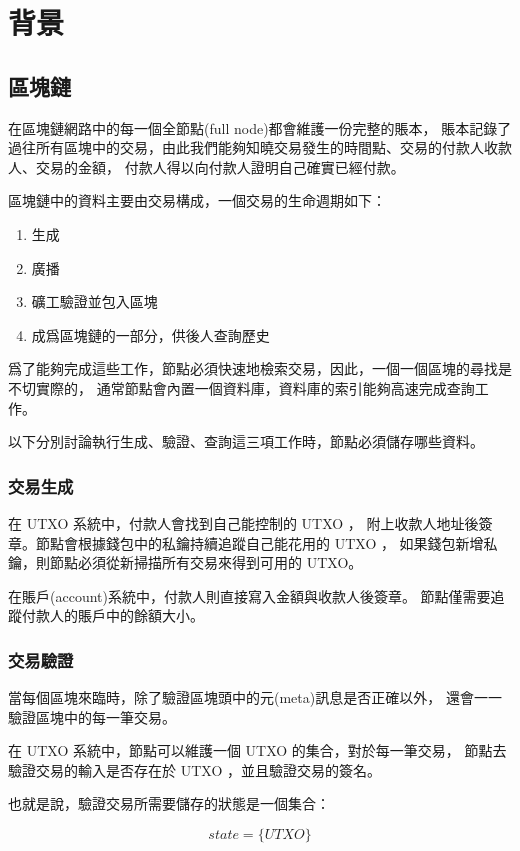 \chapter{背景}
\label{c:background}

\section{區塊鏈}
在區塊鏈網路中的每一個全節點(full node)都會維護一份完整的賬本，
賬本記錄了過往所有區塊中的交易，由此我們能夠知曉交易發生的時間點、交易的付款人收款人、交易的金額，
付款人得以向付款人證明自己確實已經付款。

區塊鏈中的資料主要由交易構成，一個交易的生命週期如下：

\begin{enumerate}
  \item 生成
  \item 廣播
  \item 礦工驗證並包入區塊
  \item 成爲區塊鏈的一部分，供後人查詢歷史
\end{enumerate}

爲了能夠完成這些工作，節點必須快速地檢索交易，因此，一個一個區塊的尋找是不切實際的， 
通常節點會內置一個資料庫，資料庫的索引能夠高速完成查詢工作。

以下分別討論執行生成、驗證、查詢這三項工作時，節點必須儲存哪些資料。

\subsection{交易生成}
在 UTXO 系統中，付款人會找到自己能控制的 UTXO ，
附上收款人地址後簽章。節點會根據錢包中的私鑰持續追蹤自己能花用的 UTXO ，
如果錢包新增私鑰，則節點必須從新掃描所有交易來得到可用的 UTXO。

在賬戶(account)系統中，付款人則直接寫入金額與收款人後簽章。
節點僅需要追蹤付款人的賬戶中的餘額大小。
\subsection{交易驗證}
當每個區塊來臨時，除了驗證區塊頭中的元(meta)訊息是否正確以外，
還會一一驗證區塊中的每一筆交易。

在 UTXO 系統中，節點可以維護一個 UTXO 的集合，對於每一筆交易，
節點去驗證交易的輸入是否存在於 UTXO ，並且驗證交易的簽名。

也就是說，驗證交易所需要儲存的狀態是一個集合：

\[state = \{UTXO\}\]

